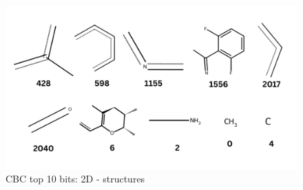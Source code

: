 \begin{figure}[htbp!] %
	\centering
	\includegraphics[scale=0.30]{top10crudebitsv2.png} %
	\caption{CBC top 10 bits: 2D - structures}
	\label{fig:top10crudebits} %
\end{figure}


